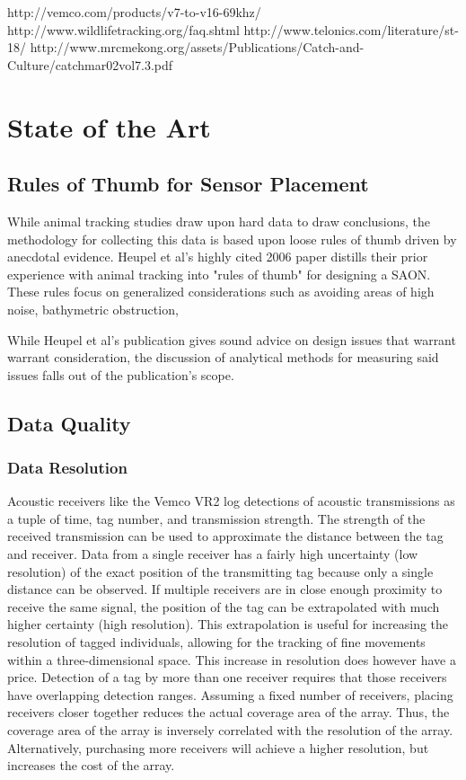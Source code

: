 http://vemco.com/products/v7-to-v16-69khz/
http://www.wildlifetracking.org/faq.shtml
http://www.telonics.com/literature/st-18/
http://www.mrcmekong.org/assets/Publications/Catch-and-Culture/catchmar02vol7.3.pdf










\section{State of the Art}

\subsection{Rules of Thumb for Sensor Placement}
\label{RulesOfThumb}
While animal tracking studies draw upon hard data to draw conclusions, the methodology for collecting this data is based upon loose rules of thumb driven by anecdotal evidence.  Heupel et al's highly cited 2006 paper distills their prior experience with animal tracking into "rules of thumb" for designing a SAON.  These rules focus on generalized considerations such as avoiding areas of high noise, bathymetric obstruction, 

While Heupel et al's publication gives sound advice on design issues that warrant warrant consideration, the discussion of analytical methods for measuring said issues falls out of the publication's scope.

\subsection{Data Quality}
\label{dataQuality}

\subsubsection{Data Resolution}
\label{dataResolution}
Acoustic receivers like the Vemco VR2 log detections of acoustic transmissions as a tuple of time, tag number, and transmission strength.  The strength of the received transmission can be used to approximate the distance between the tag and receiver.  Data from a single receiver has a fairly high uncertainty (low resolution) of the exact position of the transmitting tag because only a single distance can be observed.  If multiple receivers are in close enough proximity to receive the same signal, the position of the tag can be extrapolated with much higher certainty (high resolution).  This extrapolation is useful for increasing the resolution of tagged individuals, allowing for the tracking of fine movements within a three-dimensional space.  This increase in resolution does however have a price.  Detection of a tag by more than one receiver requires that those receivers have overlapping detection ranges.  Assuming a fixed number of receivers, placing receivers closer together reduces the actual coverage area of the array.  Thus, the coverage area of the array is inversely correlated with the resolution of the array.  Alternatively, purchasing more receivers will achieve a higher resolution, but increases the cost of the array.


